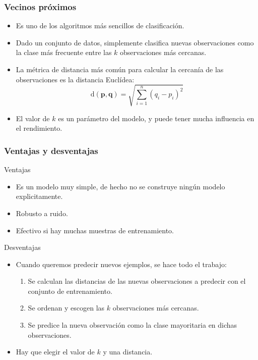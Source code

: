 \documentclass{beamer}
\begin{document}
\begin{frame}
\frametitle{Vecinos próximos}

\begin{itemize}
\item Es uno de los algoritmos más sencillos de clasificación.
\item Dado un conjunto de datos, simplemente clasifica nuevas observaciones como la clase más frecuente entre las $k$ observaciones más cercanas.
\item La métrica de distancia más común para calcular la cercanía de las observaciones es la distancia Euclídea:
$$\text{d}(\mathbf{p}, \mathbf{q}) = \sqrt{\sum_{i=1}^{n}{(q_i-p_i)^2}}$$
\item El valor de $k$ es un parámetro del modelo, y puede tener mucha influencia en el rendimiento.
\end{itemize}
\end{frame}

\begin{frame}
\frametitle{Ventajas y desventajas}
Ventajas
\begin{itemize}
\item Es un modelo muy simple, de hecho no se construye ningún modelo explicitamente.
\item Robusto a ruido.
\item Efectivo si hay muchas muestras de entrenamiento.
\end{itemize}
Desventajas
\begin{itemize}
\item Cuando queremos predecir nuevos ejemplos, se hace todo el trabajo:
\begin{enumerate}
\item Se calculan las distancias de las nuevas observaciones a predecir con el conjunto de entrenamiento.
\item Se ordenan y escogen las $k$ observaciones más cercanas.
\item Se predice la nueva observación como la clase mayoritaria en dichas observaciones.
\end{enumerate}
\item Hay que elegir el valor de $k$ y una distancia.
\end{itemize}
\end{frame}
\end{document}
